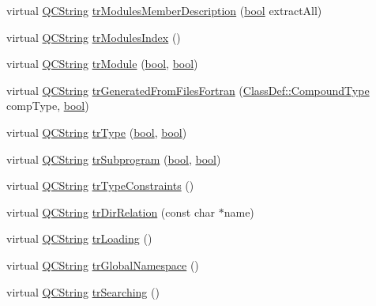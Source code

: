 \begin{DoxyCompactItemize}
virtual \hyperlink{class_q_c_string}{Q\+C\+String} \hyperlink{class_translator_japanese_ae7648c8c570d99fa6e60725385716b74}{tr\+Modules\+Member\+Description} (\hyperlink{qglobal_8h_a1062901a7428fdd9c7f180f5e01ea056}{bool} extract\+All)
\item 
virtual \hyperlink{class_q_c_string}{Q\+C\+String} \hyperlink{class_translator_japanese_a246e8cf46ee7e2af07831b55cf5b9608}{tr\+Modules\+Index} ()
\item 
virtual \hyperlink{class_q_c_string}{Q\+C\+String} \hyperlink{class_translator_japanese_a357fb0ca2586478cf1f0d1ce81fa78a1}{tr\+Module} (\hyperlink{qglobal_8h_a1062901a7428fdd9c7f180f5e01ea056}{bool}, \hyperlink{qglobal_8h_a1062901a7428fdd9c7f180f5e01ea056}{bool})
\item 
virtual \hyperlink{class_q_c_string}{Q\+C\+String} \hyperlink{class_translator_japanese_a21b41a1dce30b8cbca15050d62ba62b2}{tr\+Generated\+From\+Files\+Fortran} (\hyperlink{class_class_def_ae70cf86d35fe954a94c566fbcfc87939}{Class\+Def\+::\+Compound\+Type} comp\+Type, \hyperlink{qglobal_8h_a1062901a7428fdd9c7f180f5e01ea056}{bool})
\item 
virtual \hyperlink{class_q_c_string}{Q\+C\+String} \hyperlink{class_translator_japanese_afe53027b537d75f15b36d972ef1c83f4}{tr\+Type} (\hyperlink{qglobal_8h_a1062901a7428fdd9c7f180f5e01ea056}{bool}, \hyperlink{qglobal_8h_a1062901a7428fdd9c7f180f5e01ea056}{bool})
\item 
virtual \hyperlink{class_q_c_string}{Q\+C\+String} \hyperlink{class_translator_japanese_a8af1dd8d9b0ee2f95eb53bd7996b3580}{tr\+Subprogram} (\hyperlink{qglobal_8h_a1062901a7428fdd9c7f180f5e01ea056}{bool}, \hyperlink{qglobal_8h_a1062901a7428fdd9c7f180f5e01ea056}{bool})
\item 
virtual \hyperlink{class_q_c_string}{Q\+C\+String} \hyperlink{class_translator_japanese_ab939c0522440d2a44474efb3594e4b29}{tr\+Type\+Constraints} ()
\item 
virtual \hyperlink{class_q_c_string}{Q\+C\+String} \hyperlink{class_translator_japanese_a6439a677a30660562565a37df3469aff}{tr\+Dir\+Relation} (const char $\ast$name)
\item 
virtual \hyperlink{class_q_c_string}{Q\+C\+String} \hyperlink{class_translator_japanese_a25ecacc49af6381bb740bb9e2a68c42c}{tr\+Loading} ()
\item 
virtual \hyperlink{class_q_c_string}{Q\+C\+String} \hyperlink{class_translator_japanese_a5dc83a5a2f62b37815e590c651c7805c}{tr\+Global\+Namespace} ()
\item 
virtual \hyperlink{class_q_c_string}{Q\+C\+String} \hyperlink{class_translator_japanese_a6e75ae8c17f2b5b43814b15eaf7693c9}{tr\+Searching} ()

\end{DoxyCompactItemize}
